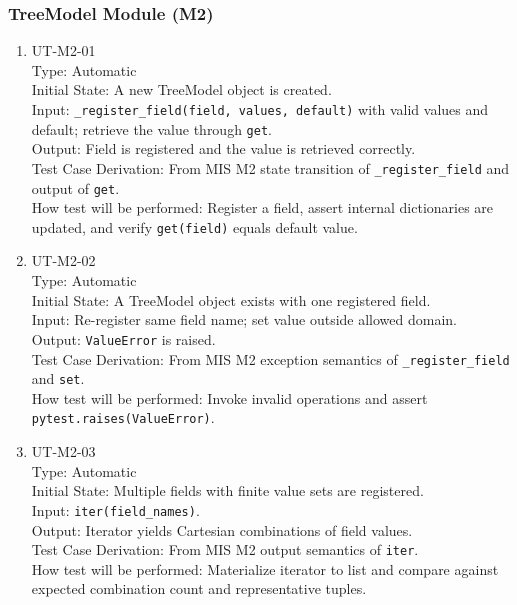\documentclass[12pt, titlepage]{article}
\begin{document}
\subsubsection{TreeModel Module (M2)}
\begin{enumerate}

\item{UT-M2-01\\}
    Type: Automatic \\
    Initial State: A new TreeModel object is created. \\
    Input: \lstinline|_register_field(field, values, default)| with valid values and default; retrieve the value through \lstinline|get|. \\
    Output: Field is registered and the value is retrieved correctly. \\
    Test Case Derivation: From MIS M2 state transition of \lstinline|_register_field| and output of \lstinline|get|. \\
    How test will be performed: Register a field, assert internal dictionaries are updated, and verify \lstinline|get(field)| equals default value.

\item{UT-M2-02\\}
    Type: Automatic \\
    Initial State: A TreeModel object exists with one registered field. \\
    Input: Re-register same field name; set value outside allowed domain. \\
    Output: \lstinline|ValueError| is raised. \\
    Test Case Derivation: From MIS M2 exception semantics of \lstinline|_register_field| and \lstinline|set|. \\
    How test will be performed: Invoke invalid operations and assert \lstinline|pytest.raises(ValueError)|.

\item{UT-M2-03\\}
    Type: Automatic \\
    Initial State: Multiple fields with finite value sets are registered. \\
    Input: \lstinline|iter(field_names)|. \\
    Output: Iterator yields Cartesian combinations of field values. \\
    Test Case Derivation: From MIS M2 output semantics of \lstinline|iter|. \\
    How test will be performed: Materialize iterator to list and compare against expected combination count and representative tuples.

\end{enumerate}
\end{document}
